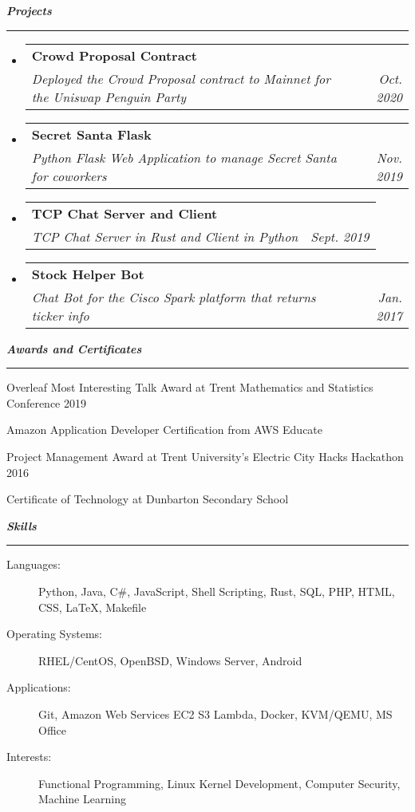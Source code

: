 \documentclass[letterpaper,11pt]{article}
\makeatletter
\newcommand{\mysection}[1]{\vspace{5pt} {\bfseries \textsl{#1}} \\ {\color{gray} \rule[5pt]{\textwidth}{1pt}}}
\newcommand{\ressubheading}[4]{\begin{tabular*}{6.5in}{l@{\extracolsep{\fill}}r}
        \textbf{#1} & #2 \\
        \textit{#3} & \textit{#4} \\
\end{tabular*}\vspace{-6pt}}
\makeatother
\begin{document}
\mysection{Projects}
\begin{itemize}
    \item
        \ressubheading{Crowd Proposal Contract}{}{Deployed the Crowd Proposal contract to Mainnet for the Uniswap Penguin Party}{Oct. 2020}
    \item
        \ressubheading{Secret Santa Flask}{}{Python Flask Web Application to manage Secret Santa for coworkers}{Nov. 2019}
    \item
        \ressubheading{TCP Chat Server and Client}{}{TCP Chat Server in Rust and Client in Python}{Sept. 2019}
    \item
        \ressubheading{Stock Helper Bot}{}{Chat Bot for the Cisco Spark platform that returns ticker info}{Jan. 2017}
\end{itemize}

\mysection{Awards and Certificates}
\begin{description}
    \item Overleaf Most Interesting Talk Award at Trent Mathematics and Statistics Conference 2019
    \item Amazon Application Developer Certification from AWS Educate
    \item Project Management Award at Trent University's Electric City Hacks Hackathon 2016
    \item Certificate of Technology at Dunbarton Secondary School
\end{description}

\mysection{Skills}
\begin{description}
    \item[Languages:]
        Python, Java, C\#, JavaScript, Shell Scripting, Rust, SQL, PHP, HTML, CSS, \LaTeX{}, Makefile
    \item[Operating Systems:]
        RHEL/CentOS, OpenBSD, Windows Server, Android
    \item[Applications:]
        Git, Amazon Web Services EC2 S3 Lambda, Docker, KVM/QEMU, MS Office
    \item[Interests:]
        Functional Programming, Linux Kernel Development, Computer Security, Machine Learning
\end{description}
\end{document}
